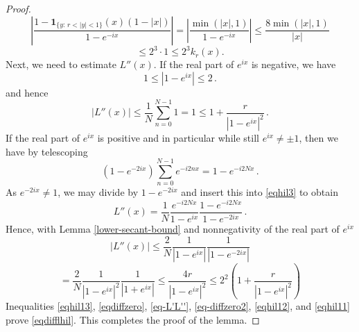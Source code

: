 {\begin{proof}
\begin{equation*}
   \left|\frac{1-\mathbf{1}_{{\{y:\, r<|y|<1\}}}(x)(1-|x|)}{1-e^{-ix}} \right|=\left|\frac{\min(|x|, 1)}{1-e^{-ix}} \right|\leq \frac{8\min(|x|, 1)}{|x|}
\end{equation*}
\begin{equation}
 \label{eq-diffzero2}
    \leq 2^3\cdot 1\leq  2^{3} k_r(x).
\end{equation}
Next, we need to estimate $L''(x)$. If the real part of
$e^{ix}$ is negative, we have
\begin{equation}
  1\le   |1-e^{ix}|\le 2\, .
\end{equation}
and hence
\begin{equation}\label{eqhil12}
    |L''(x)|\le
     \frac 1N
     \sum_{n=0}^{N-1}
    1=1\le 1+\frac r{|1-e^{ix}|^2}\, .
\end{equation}
If the real part of $e^{ix}$ is positive and in particular while still $e^{ix}\neq \pm 1$, then  we have by telescoping
\begin{equation}
 (1-e^{-2ix})
     \sum_{n=0}^{N-1}
    {e^{-i2nx}}=1-e^{-i2Nx}\, .
\end{equation}
As $e^{-2ix}\neq 1$, we may divide by $1-e^{-2ix}$ and insert this into
\eqref{eqhil3} to obtain
\begin{equation}
 L''(x)=
           \frac 1N \frac {e^{-i2Nx}}{1-e^{ix}}
     \frac{1-e^{-i2Nx}}{1-e^{-2ix}}\, .
\end{equation}
Hence, with Lemma \ref{lower-secant-bound} and nonnegativity of the real part of $e^{ix}$
\begin{equation*}
    |L''(x)|
 \le \frac 2 N \frac {1}{|1-e^{ix}|}
     \frac{1}{|1-e^{-2ix}|}
 \end{equation*}
\begin{equation}\label{eqhil11}
    = \frac 2 N \frac {1}{|1-e^{ix}|^2}
     \frac{1}{|1+e^{ix}|}\le
 \frac {4r}{|1-e^{ix}|^2}\le 2^{2} \left (1+\frac {r}{|1-e^{ix}|^2}\right)
\end{equation}
Inequalities \eqref{eqhil13}, \eqref{eqdiffzero}, \eqref{eq-L'L''}, \eqref{eq-diffzero2}, \eqref{eqhil12}, and \eqref{eqhil11} prove \eqref{eqdifflhil}. This completes the proof of the lemma.
\end{proof}


}
